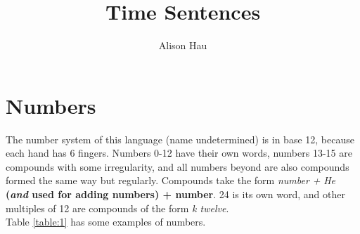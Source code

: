 \documentclass{article}
\title{Time Sentences}
\author{Alison Hau\vspace{-2ex}}
\date{}
\begin{document}
\maketitle
 
\section{Numbers}
The number system of this language (name undetermined) is in base 12, because each hand has 6 fingers. Numbers 0-12 have their own words, numbers 13-15 are compounds with some irregularity, and all numbers beyond are also compounds formed the same way but regularly.  Compounds take the form \textit{number + } \textit{He} \textbf{(\textit{and} used for adding numbers) + number}.  24 is its own word, and other multiples of 12 are compounds of the form \textit{k twelve}. \\

Table \ref{table:1} has some examples of numbers.  \\
\end{document}
